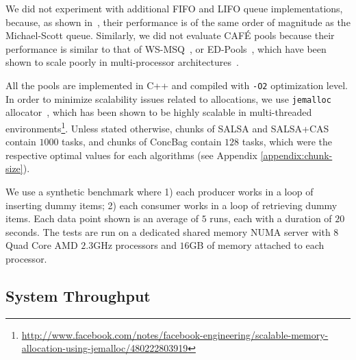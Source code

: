 We did not experiment with additional FIFO and LIFO queue implementations, because, as shown in~\cite{Sundell:2011:LAC:1989493.1989550}, their performance is of the same order of magnitude as the Michael-Scott queue. 
Similarly, we did not evaluate {CAF\'E}\cite{Basin:2011:CST:2075029.2075087} pools because their performance is similar to that of WS-MSQ~\cite{Basin:Thesis:2011}, or ED-Pools~\cite{Afek:2010:SPP:1885276.1885295}, which have been shown to scale poorly in multi-processor architectures~\cite{Basin:Thesis:2011,Sundell:2011:LAC:1989493.1989550}. 

All the pools are implemented in C++ and compiled with \texttt{-O2} optimization level. 
In order to minimize scalability issues related to allocations, we use \texttt{jemalloc} allocator~\cite{citeulike:4951109}, which has been shown to be highly scalable in multi-threaded environments\footnote{\url{http://www.facebook.com/notes/facebook-engineering/scalable-memory-allocation-using-jemalloc/480222803919}}.
Unless stated otherwise, chunks of SALSA and SALSA+CAS contain $1000$ tasks, and chunks of ConcBag contain $128$ tasks, which were the respective optimal values for each algorithms (see Appendix \ref{appendix:chunk-size}). 

We use a synthetic benchmark where 1) each producer works in a loop of inserting dummy items; 2) each consumer works in a loop of retrieving dummy items. Each data point shown is an average of $5$ runs, each with a duration of $20$ seconds. 
The tests are run on a dedicated shared memory NUMA server with $8$ Quad Core AMD $2.3$GHz processors and $16$GB of memory attached to each processor. 

\subsection{System Throughput}
\label{sec:eval-performance}

